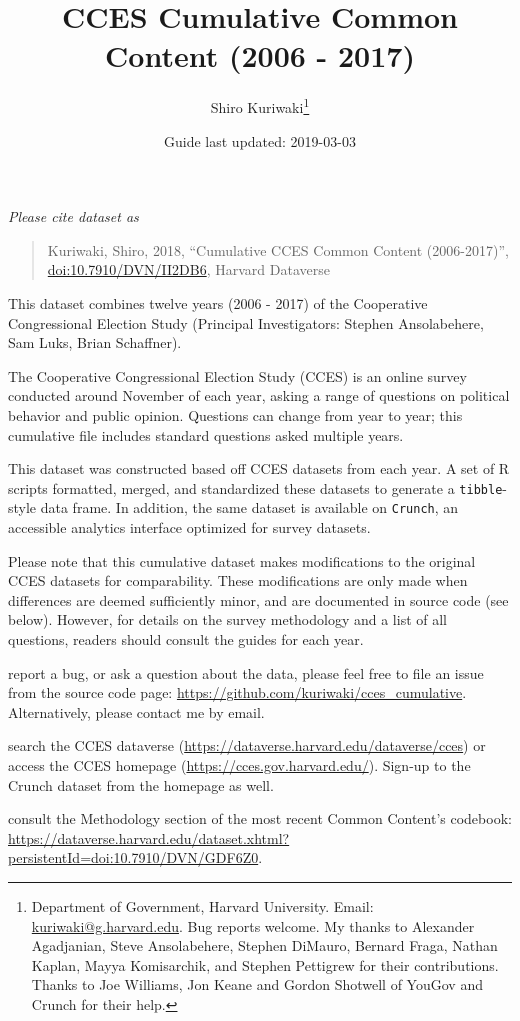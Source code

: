 \documentclass[10pt,article,oneside]{memoir}
\title{ \LARGE\textbf{CCES Cumulative Common Content (2006 - 2017)}}
\author{Shiro Kuriwaki\thanks{Department of Government, Harvard University. Email:
\url{kuriwaki@g.harvard.edu}. Bug reports welcome. My thanks to
Alexander Agadjanian, Steve Ansolabehere, Stephen DiMauro, Bernard
Fraga, Nathan Kaplan, Mayya Komisarchik, and Stephen Pettigrew for their
contributions. Thanks to Joe Williams, Jon Keane and Gordon Shotwell of
YouGov and Crunch for their help.}  }
\date{Guide last updated: 2019-03-03}
\theoremstyle{definition}
\begin{document}
\maketitle





\renewcommand\UrlFont{\color{crimson}\ttfamily}

\emph{Please cite dataset as}

\begin{quote}
Kuriwaki, Shiro, 2018, ``Cumulative CCES Common Content (2006-2017)'',
\href{https://dataverse.harvard.edu/dataset.xhtml?persistentId=doi:10.7910/DVN/II2DB6}{\url{doi:10.7910/DVN/II2DB6}},
Harvard Dataverse
\end{quote}

\noindent This dataset combines twelve years (2006 - 2017) of the
Cooperative Congressional Election Study (Principal Investigators:
Stephen Ansolabehere, Sam Luks, Brian Schaffner).

The Cooperative Congressional Election Study (CCES) is an online survey
conducted around November of each year, asking a range of questions on
political behavior and public opinion. Questions can change from year to
year; this cumulative file includes standard questions asked multiple
years.

This dataset was constructed based off CCES datasets from each year. A
set of R scripts formatted, merged, and standardized these datasets to
generate a \texttt{tibble}-style data frame. In addition, the same
dataset is available on \texttt{Crunch}, an accessible analytics
interface optimized for survey datasets.

Please note that this cumulative dataset makes modifications to the
original CCES datasets for comparability. These modifications are only
made when differences are deemed sufficiently minor, and are documented
in source code (see below). However, for details on the survey
methodology and a list of all questions, readers should consult the
guides for each year.

\bigskip

\begin{tcolorbox}[boxrule=0pt,  fonttitle=\bfseries, subtitle style={boxrule=0.4pt, colback=black!75!white}]

report a bug, or ask a question about the data, please feel free to file an issue from the source code page:  \url{https://github.com/kuriwaki/cces_cumulative}. Alternatively, please contact me by email.

search the CCES dataverse (\url{https://dataverse.harvard.edu/dataverse/cces}) or access the CCES homepage (\url{https://cces.gov.harvard.edu/}). Sign-up to the Crunch dataset from the homepage as well.

consult the Methodology section of the most recent Common Content's codebook: \url{https://dataverse.harvard.edu/dataset.xhtml?persistentId=doi:10.7910/DVN/GDF6Z0}.

\end{tcolorbox}
\end{document}
